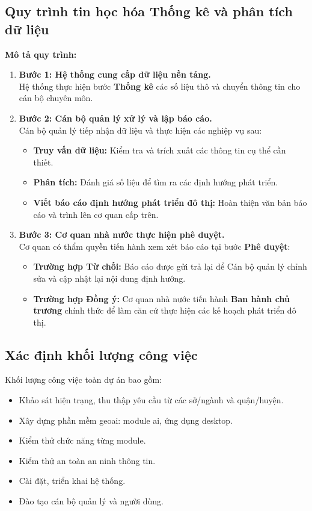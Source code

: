 \subsection{Quy trình tin học hóa Thống kê và phân tích dữ liệu}

\textbf{Mô tả quy trình:}
\begin{enumerate}
    \item \textbf{Bước 1: Hệ thống cung cấp dữ liệu nền tảng.} \\
    Hệ thống thực hiện bước \textbf{Thống kê} các số liệu thô và chuyển thông tin cho cán bộ chuyên môn.
    
    \item \textbf{Bước 2: Cán bộ quản lý xử lý và lập báo cáo.} \\
    Cán bộ quản lý tiếp nhận dữ liệu và thực hiện các nghiệp vụ sau:
    \begin{itemize}
        \item \textbf{Truy vấn dữ liệu:} Kiểm tra và trích xuất các thông tin cụ thể cần thiết.
        \item \textbf{Phân tích:} Đánh giá số liệu để tìm ra các định hướng phát triển.
        \item \textbf{Viết báo cáo định hướng phát triển đô thị:} Hoàn thiện văn bản báo cáo và trình lên cơ quan cấp trên.
    \end{itemize}
    
    \item \textbf{Bước 3: Cơ quan nhà nước thực hiện phê duyệt.} \\
    Cơ quan có thẩm quyền tiến hành xem xét báo cáo tại bước \textbf{Phê duyệt}:
    \begin{itemize}
        \item \textbf{Trường hợp Từ chối:} Báo cáo được gửi trả lại để Cán bộ quản lý chỉnh sửa và cập nhật lại nội dung định hướng.
        \item \textbf{Trường hợp Đồng ý:} Cơ quan nhà nước tiến hành \textbf{Ban hành chủ trương} chính thức để làm căn cứ thực hiện các kế hoạch phát triển đô thị.
    \end{itemize}
\end{enumerate}

\subsection{Xác định khối lượng công việc}
Khối lượng công việc toàn dự án bao gồm:
\begin{itemize}
    \item Khảo sát hiện trạng, thu thập yêu cầu từ các sở/ngành và quận/huyện.
    \item Xây dựng phần mềm \gls{geoai}: module \gls{ai}, ứng dụng desktop.
    \item Kiểm thử chức năng từng module.
    \item Kiểm thử an toàn an ninh thông tin.
    \item Cài đặt, triển khai hệ thống.
    \item Đào tạo cán bộ quản lý và người dùng.
\end{itemize}


